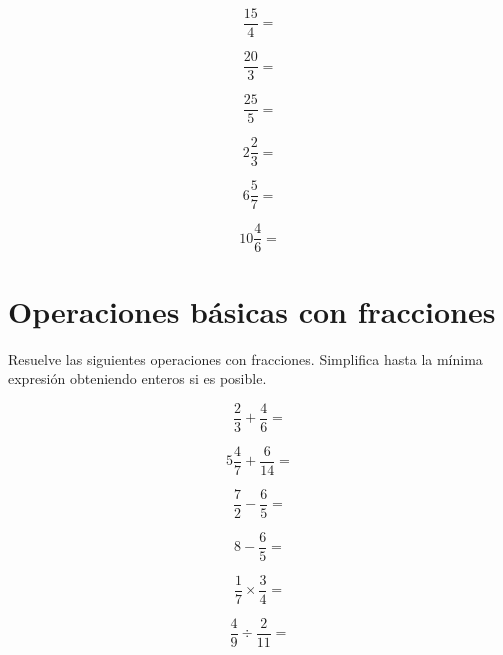 \documentclass[11pt]{article}
\begin{document}
\begin{multicols}{3}

\begin{equation}    \frac{15}{4}=   \nonumber\end{equation}

\begin{equation}    \frac{20}{3}=   \nonumber\end{equation}

\begin{equation}    \frac{25}{5}=   \nonumber\end{equation}

\begin{equation}    2\frac{2}{3}=   \nonumber\end{equation}

\begin{equation}    6\frac{5}{7}=   \nonumber\end{equation}

\begin{equation}    10\frac{4}{6}=  \nonumber\end{equation}

\end{multicols}

\vspace{0.5cm}

\section{Operaciones b\'asicas con fracciones}
Resuelve las siguientes operaciones con fracciones. Simplifica hasta la m\'inima
expresi\'on obteniendo enteros si es posible.

\begin{multicols}{2}

\begin{equation*}   \frac{2}{3}+\frac{4}{6}=        \end{equation*}

\begin{equation*}   5\frac{4}{7}+\frac{6}{14}=      \end{equation*}

\begin{equation*}   \frac{7}{2}-\frac{6}{5}=        \end{equation*}

\begin{equation*}   8-\frac{6}{5}=                  \end{equation*}

\begin{equation*}   \frac{1}{7}\times\frac{3}{4}=   \end{equation*}

\begin{equation*}   \frac{4}{9}\div\frac{2}{11}=    \end{equation*}

\end{multicols}
\end{document}
